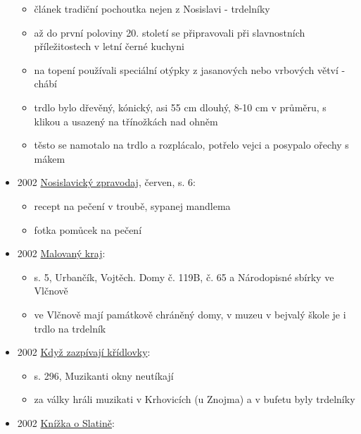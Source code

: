 \begin{itemize}
  \begin{itemize}
  \tightlist
  \item
    článek tradiční pochoutka nejen z Nosislavi - trdelníky
  \item
    až do první poloviny 20. století se připravovali při slavnostních
    příležitostech v letní černé kuchyni
  \item
    na topení používali speciální otýpky z jasanových nebo vrbových
    větví - chábí
  \item
    trdlo bylo dřevěný, kónický, asi 55 cm dlouhý, 8-10 cm v průměru, s
    klikou a usazený na třínožkách nad ohněm
  \item
    těsto se namotalo na trdlo a rozplácalo, potřelo vejci a posypalo
    ořechy s mákem
  \end{itemize}
\item
  2002
  \href{https://www.nosislav.cz/assets/File.ashx?id_org=10486&id_dokumenty=1709}{Nosislavický
  zpravodaj}, červen, s. 6:

  \begin{itemize}
  \tightlist
  \item
    recept na pečení v troubě, sypanej mandlema
  \item
    fotka pomůcek na pečení
  \end{itemize}
\item
  2002
  \href{https://ceskadigitalniknihovna.cz/uuid/uuid:0e216ec0-0395-11e4-a680-5ef3fc9bb22f}{Malovaný
  kraj}:

  \begin{itemize}
  \tightlist
  \item
    s. 5, Urbančík, Vojtěch. Domy č. 119B, č. 65 a Národopisné sbírky ve
    Vlčnově
  \item
    ve Vlčnově mají památkově chráněný domy, v muzeu v bejvalý škole je
    i trdlo na trdelník
  \end{itemize}
\item
  2002
  \href{https://ceskadigitalniknihovna.cz/uuid/uuid:cd4bfec0-29e6-11ed-af34-5ef3fc9bb22f}{Když
  zazpívají křídlovky}:

  \begin{itemize}
  \tightlist
  \item
    s. 296, Muzikanti okny neutíkají
  \item
    za války hráli muzikati v Krhovicích (u Znojma) a v bufetu byly
    trdelníky
  \end{itemize}
\item
  2002
  \href{https://ceskadigitalniknihovna.cz/uuid/uuid:b70d1490-9c83-11ed-b51a-005056827e52}{Knížka
  o Slatině}:


\end{itemize}
